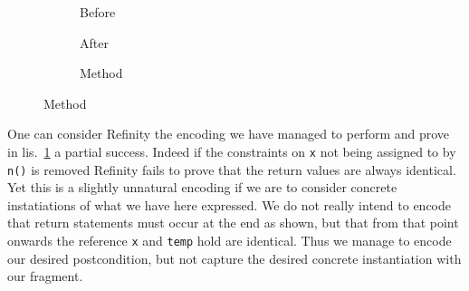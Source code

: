 \begin{figure}[!htb]
  \centering
  \begin{subfigure}[b]{.34\linewidth}
    
    \caption{Before}
  \end{subfigure}\hspace{1cm}
  \begin{subfigure}[b]{.34\linewidth}
    
    \caption{After}
  \end{subfigure}\vspace{1mm}
  \begin{subfigure}[b]{.39\linewidth}
    
    \caption{Method}
  \end{subfigure}
\label{lst:ExtractVariable-refinity}
\end{figure}

One can consider Refinity the encoding we have managed to perform and prove in lis.~\ref{lst:ExtractVariable-refinity} a partial success. Indeed if the constraints on
\lstinline[style=refinity]|x| not being assigned to by \lstinline[style=refinity]|n()| is removed Refinity fails to prove that the return values are always identical.
Yet this is a slightly unnatural encoding if we are to consider concrete instatiations of what we have here expressed. We do not really intend to encode that return
statements must occur at the end as shown, but that from that point onwards the reference \lstinline[style=refinity]|x| and \lstinline[style=refinity]|temp| hold
are identical. Thus we manage to encode our desired postcondition, but not capture the desired concrete instantiation with our fragment.
